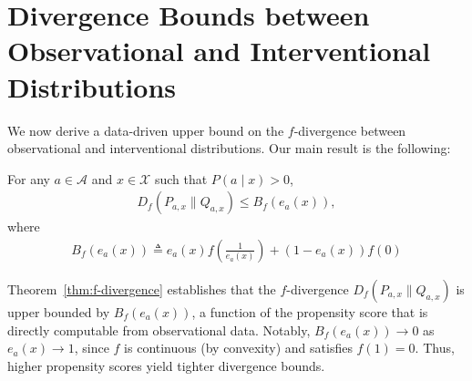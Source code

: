 \section{Divergence Bounds between Observational and Interventional Distributions}\label{sec:3}

We now derive a data-driven upper bound on the $f$-divergence between observational and interventional distributions. Our main result is the following: 
\begin{theorem}\label{thm:f-divergence}
    \normalfont
    For any $a \in \mathcal{A}$ and $x \in \mathcal{X}$ such that $P(a \mid x) > 0$, 
    \begin{align}
        D_{f}( P_{a,x} \| Q_{a,x}) \leq B_f(e_a(x)),
    \end{align}
    where 
    \begin{align}
        B_f(e_a(x)) \triangleq e_a(x)f\left(\frac{1}{e_a(x)} \right) + (1-e_a(x))f(0)
    \end{align}
\end{theorem}
Theorem~\ref{thm:f-divergence} establishes that the $f$-divergence $D_f(P_{a,x} \| Q_{a,x})$ is upper bounded by $B_f(e_a(x))$, a function of the propensity score that is directly computable from observational data. Notably, $B_f(e_a(x)) \to 0$ as $e_a(x) \to 1$, since $f$ is continuous (by convexity) and satisfies $f(1) = 0$. Thus, higher propensity scores yield tighter divergence bounds. 

